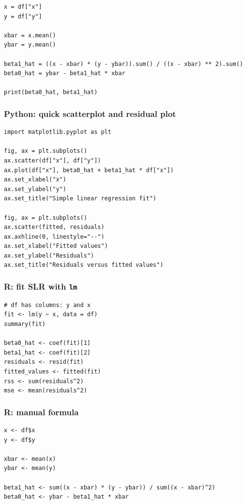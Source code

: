 \begin{verbatim}
x = df["x"]
y = df["y"]

xbar = x.mean()
ybar = y.mean()

beta1_hat = ((x - xbar) * (y - ybar)).sum() / ((x - xbar) ** 2).sum()
beta0_hat = ybar - beta1_hat * xbar

print(beta0_hat, beta1_hat)
\end{verbatim}

\subsubsection*{Python: quick scatterplot and residual plot}

\begin{verbatim}
import matplotlib.pyplot as plt

fig, ax = plt.subplots()
ax.scatter(df["x"], df["y"])
ax.plot(df["x"], beta0_hat + beta1_hat * df["x"])
ax.set_xlabel("x")
ax.set_ylabel("y")
ax.set_title("Simple linear regression fit")

fig, ax = plt.subplots()
ax.scatter(fitted, residuals)
ax.axhline(0, linestyle="--")
ax.set_xlabel("Fitted values")
ax.set_ylabel("Residuals")
ax.set_title("Residuals versus fitted values")
\end{verbatim}

\subsubsection*{R: fit SLR with \texttt{lm}}

\begin{verbatim}
# df has columns: y and x
fit <- lm(y ~ x, data = df)
summary(fit)

beta0_hat <- coef(fit)[1]
beta1_hat <- coef(fit)[2]
residuals <- resid(fit)
fitted_values <- fitted(fit)
rss <- sum(residuals^2)
mse <- mean(residuals^2)
\end{verbatim}

\subsubsection*{R: manual formula}

\begin{verbatim}
x <- df$x
y <- df$y

xbar <- mean(x)
ybar <- mean(y)

beta1_hat <- sum((x - xbar) * (y - ybar)) / sum((x - xbar)^2)
beta0_hat <- ybar - beta1_hat * xbar
\end{verbatim}

